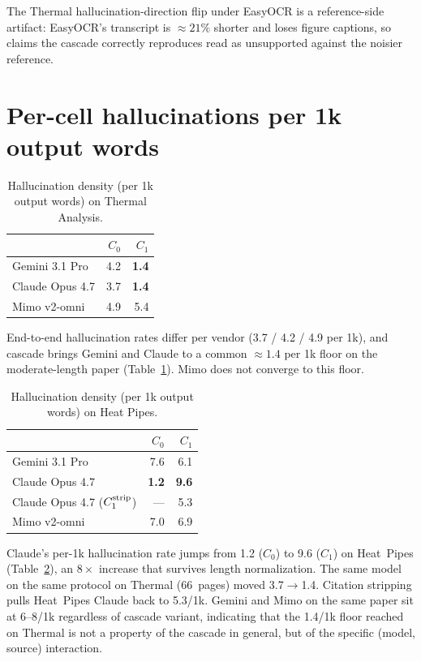 \documentclass[11pt]{article}
\begin{document}
The Thermal hallucination-direction flip under EasyOCR is a reference-side artifact: EasyOCR's transcript is $\approx 21\%$ shorter and loses figure captions, so claims the cascade correctly reproduces read as unsupported against the noisier reference.

\section{Per-cell hallucinations per 1k output words}
\label{appdx:perword}

\begin{table}[h]
\centering
\small
\caption{Hallucination density (per 1k output words) on Thermal Analysis.}
\label{tab:per_word_halluc}
\begin{tabular}{lrr}
\toprule
& $C_0$ & $C_1$ \\
\midrule
Gemini 3.1 Pro  & 4.2 & \textbf{1.4} \\
Claude Opus 4.7 & 3.7 & \textbf{1.4} \\
Mimo v2-omni    & 4.9 & 5.4 \\
\bottomrule
\end{tabular}
\end{table}

End-to-end hallucination rates differ per vendor (3.7 / 4.2 / 4.9 per 1k), and cascade brings Gemini and Claude to a common $\approx 1.4$ per 1k floor on the moderate-length paper (Table~\ref{tab:per_word_halluc}). Mimo does not converge to this floor.

\begin{table}[h]
\centering
\small
\caption{Hallucination density (per 1k output words) on Heat Pipes.}
\label{tab:per_word_halluc_hp}
\begin{tabular}{lrr}
\toprule
& $C_0$ & $C_1$ \\
\midrule
Gemini 3.1 Pro                            & 7.6 & 6.1 \\
Claude Opus 4.7                           & \textbf{1.2} & \textbf{9.6} \\
Claude Opus 4.7 ($C_1^{\rm strip}$)       & --- & 5.3 \\
Mimo v2-omni                              & 7.0 & 6.9 \\
\bottomrule
\end{tabular}
\end{table}

Claude's per-1k hallucination rate jumps from 1.2 ($C_0$) to 9.6 ($C_1$) on Heat~Pipes (Table~\ref{tab:per_word_halluc_hp}), an $8\times$ increase that survives length normalization. The same model on the same protocol on Thermal (66~pages) moved 3.7$\to$1.4. Citation stripping pulls Heat~Pipes Claude back to 5.3/1k. Gemini and Mimo on the same paper sit at $6$--$8$/1k regardless of cascade variant, indicating that the 1.4/1k floor reached on Thermal is not a property of the cascade in general, but of the specific (model, source) interaction.
\end{document}
